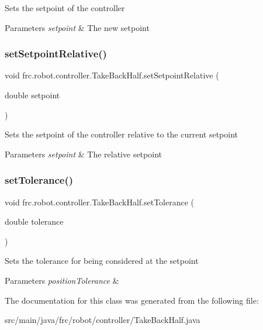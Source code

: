 Sets the setpoint of the controller


\begin{DoxyParams}{Parameters}
{\em setpoint} & The new setpoint \\
\hline
\end{DoxyParams}
\mbox{\label{classfrc_1_1robot_1_1controller_1_1_take_back_half_a9f18ef801fa35f3b5c161795c9ac51ea}} 
\subsubsection{\texorpdfstring{setSetpointRelative()}{setSetpointRelative()}}
{\footnotesize\ttfamily void frc.\+robot.\+controller.\+Take\+Back\+Half.\+set\+Setpoint\+Relative (\begin{DoxyParamCaption}\item[{double}]{setpoint }\end{DoxyParamCaption})\hspace{0.3cm}{\ttfamily [inline]}}

Sets the setpoint of the controller relative to the current setpoint


\begin{DoxyParams}{Parameters}
{\em setpoint} & The relative setpoint \\
\hline
\end{DoxyParams}
\mbox{\label{classfrc_1_1robot_1_1controller_1_1_take_back_half_a87c76e85de87101019b6eaf187dbffe5}} 
\subsubsection{\texorpdfstring{setTolerance()}{setTolerance()}}
{\footnotesize\ttfamily void frc.\+robot.\+controller.\+Take\+Back\+Half.\+set\+Tolerance (\begin{DoxyParamCaption}\item[{double}]{tolerance }\end{DoxyParamCaption})\hspace{0.3cm}{\ttfamily [inline]}}

Sets the tolerance for being considered at the setpoint


\begin{DoxyParams}{Parameters}
{\em position\+Tolerance} & \\
\hline
\end{DoxyParams}


The documentation for this class was generated from the following file\+:\begin{DoxyCompactItemize}
\item 
src/main/java/frc/robot/controller/Take\+Back\+Half.\+java\end{DoxyCompactItemize}

